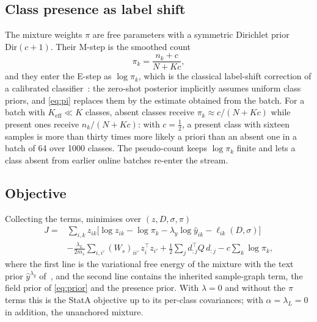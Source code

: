 \subsection{Class presence as label shift}
\label{sec:presence}
The mixture weights $\pi$ are free parameters with a symmetric Dirichlet prior $\mathrm{Dir}(c+1)$. Their M-step is the smoothed count
\begin{equation}
  \pi_k = \frac{n_k + c}{N + Kc},
  \label{eq:pi}
\end{equation}
and they enter the E-step as $\log\pi_k$, which is the classical label-shift correction of a calibrated classifier~\cite{saerens2002adjusting}: the zero-shot posterior implicitly assumes uniform class priors, and \cref{eq:pi} replaces them by the estimate obtained from the batch. For a batch with $K_{\mathrm{eff}}\ll K$ classes, absent classes receive $\pi_k\approx c/(N+Kc)$ while present ones receive $n_k/(N+Kc)$: with $c=\tfrac{1}{2}$, a present class with sixteen samples is more than thirty times more likely a priori than an absent one in a batch of 64 over 1000 classes. The pseudo-count keeps $\log\pi_k$ finite and lets a class absent from earlier online batches re-enter the stream.

\subsection{Objective}
\label{sec:objective}
Collecting the terms, \method minimises over $(z, D, \sigma, \pi)$
\begin{align}
  J ={}& \sum_{i,k} z_{ik}\big[\log z_{ik} - \log\pi_k - \lambda_y\log\hat{y}_{ik} - \ell_{ik}(D,\sigma)\big] \nonumber\\
   &- \frac{\lambda_L}{2m_s}\sum_{i,i'} (W_s)_{ii'}\, z_i^{\top} z_{i'}
    + \frac{1}{2}\sum_{j} d_{:j}^{\top} Q\, d_{:j}
    - c\sum_k \log\pi_k ,
  \label{eq:objective}
\end{align}
where the first line is the variational free energy of the mixture with the text prior $\hat{y}^{\lambda_y}$ of~\cite{zanella2024transclip}, and the second line contains the inherited sample-graph term, the field prior of \cref{eq:prior} and the presence prior. With $\lambda = 0$ and without the $\pi$ terms this is the StatA objective up to its per-class covariances; with $\alpha=\lambda_L=0$ in addition, the unanchored mixture.

